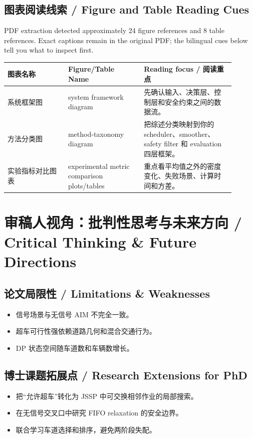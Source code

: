 \documentclass[UTF8,a4paper,11pt,fontset=fandol]{ctexart}
\begin{document}
\subsection{图表阅读线索 / Figure and Table Reading Cues}
PDF extraction detected approximately 24 figure references and 8 table references. Exact captions remain in the original PDF; the bilingual cues below tell you what to inspect first.

\begin{longtable}{p{0.24\linewidth}p{0.30\linewidth}p{0.36\linewidth}}
\toprule
图表名称 & Figure/Table Name & Reading focus / 阅读重点\\
\midrule
系统框架图 & system framework diagram & 先确认输入、决策层、控制层和安全约束之间的数据流。 \\
方法分类图 & method-taxonomy diagram & 把综述分类映射到你的 scheduler、smoother、safety filter 和 evaluation 四层框架。 \\
实验指标对比图表 & experimental metric comparison plots/tables & 重点看平均值之外的密度变化、失败场景、计算时间和方差。 \\
\bottomrule
\end{longtable}

\section{审稿人视角：批判性思考与未来方向 / Critical Thinking \& Future Directions}
\subsection{论文局限性 / Limitations \& Weaknesses}
\begin{itemize}
\item 信号场景与无信号 AIM 不完全一致。
\item 超车可行性强依赖道路几何和混合交通行为。
\item DP 状态空间随车道数和车辆数增长。
\end{itemize}


\subsection{博士课题拓展点 / Research Extensions for PhD}
\begin{itemize}
\item 把“允许超车”转化为 JSSP 中可交换相邻作业的局部搜索。
\item 在无信号交叉口中研究 FIFO relaxation 的安全边界。
\item 联合学习车道选择和排序，避免两阶段失配。
\end{itemize}
\end{document}
